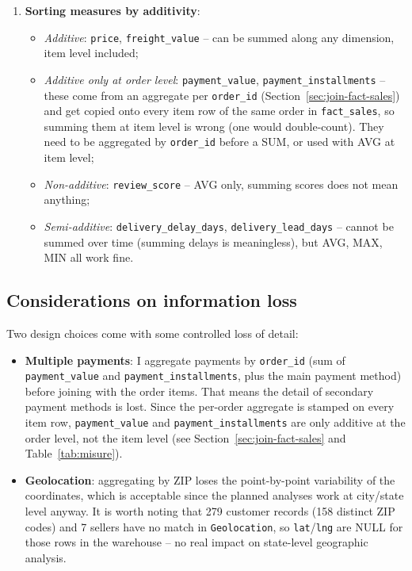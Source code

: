 \documentclass[12pt,a4paper]{article}
\begin{document}
\begin{enumerate}
  \item \textbf{Sorting measures by additivity}:
        \begin{itemize}
        \sloppy
          \item \textit{Additive}: \texttt{price}, \texttt{freight\_value} -- can be
                summed along any dimension, item level included;
          \item \textit{Additive only at order level}: \texttt{payment\_value},
                \texttt{payment\_installments} -- these come from an aggregate per
                \texttt{order\_id} (Section~\ref{sec:join-fact-sales}) and get
                copied onto every item row of the same order in
                \texttt{fact\_sales}, so summing them at item level is wrong (one
                would double-count). They need to be aggregated by
                \texttt{order\_id} before a SUM, or used with AVG at item level;
          \item \textit{Non-additive}: \texttt{review\_score} -- AVG only, summing
                scores does not mean anything;
          \item \textit{Semi-additive}: \texttt{delivery\_delay\_days},
                \texttt{delivery\_lead\_days} -- cannot be summed over time (summing
                delays is meaningless), but AVG, MAX, MIN all work fine.
        \end{itemize}
\end{enumerate}

\subsection{Considerations on information loss}

Two design choices come with some controlled loss of detail:

\begin{itemize}
  \item \textbf{Multiple payments}: I aggregate payments by \texttt{order\_id} (sum
        of \texttt{payment\_value} and \texttt{payment\_installments}, plus the main
        payment method) before joining with the order items. That means the detail
        of secondary payment methods is lost. Since the per-order aggregate is
        stamped on every item row, \texttt{payment\_value} and
        \texttt{payment\_installments} are only additive at the order level, not the
        item level (see Section~\ref{sec:join-fact-sales} and
        Table~\ref{tab:misure}).
  \item \textbf{Geolocation}: aggregating by ZIP loses the point-by-point
        variability of the coordinates, which is acceptable since the planned
        analyses work at city/state level anyway. It is worth noting that 279
        customer records (158 distinct ZIP codes) and 7 sellers have no match in
        \texttt{Geolocation}, so \texttt{lat}/\texttt{lng} are NULL for those rows
        in the warehouse -- no real impact on state-level geographic analysis.
\end{itemize}
\end{document}
